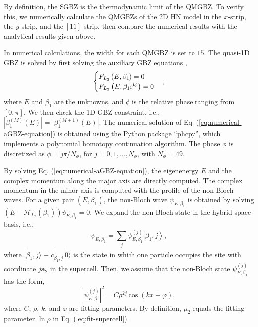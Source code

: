 By definition, the SGBZ is the thermodynamic limit of the QMGBZ. To
verify this, we numerically calculate the QMGBZs of the 2D HN model
in the $x$-strip, the $y$-strip, and the $[11]$-strip, then compare
the numerical results with the analytical results given above.

In numerical calculations, the width for each QMGBZ is set to $15$.
The quasi-1D GBZ is solved by first solving the auxiliary GBZ equations
\cite{yangNonHermitianBulkBoundaryCorrespondence2020}, 
\begin{equation}
\begin{cases}
F_{L_{2}}\left(E,\beta_{1}\right)=0\\
F_{L_{2}}\left(E,\beta_{1}\mathrm{e}^{\mathrm{i}\phi}\right)=0
\end{cases},\label{eq:numerical-aGBZ-equation}
\end{equation}
where $E$ and $\beta_{1}$ are the unknowns, and $\phi$ is the relative
phase ranging from $[0,\pi]$. We then check the 1D GBZ constraint,
i.e., $|\beta_{1}^{(M)}(E)|=|\beta_{1}^{(M+1)}(E)|$. The numerical
solution of Eq. (\ref{eq:numerical-aGBZ-equation}) is obtained using
the Python package ``phcpy''\cite{verscheldeAlgorithm795PHCpack1999},
which implements a polynomial homotopy continuation algorithm. The
phase $\phi$ is discretized as $\phi=j\pi/N_{\phi}$, for $j=0,1,\dots,N_{\phi}$,
with $N_{\phi}=49$.

By solving Eq. (\ref{eq:numerical-aGBZ-equation}), the eigenenergy
$E$ and the complex momentum along the major axis are directly computed.
The complex momentum in the minor axis is computed with the profile
of the non-Bloch waves. For a given pair $(E,\beta_{1})$, the non-Bloch
wave $\psi_{E,\beta_{1}}$ is obtained by solving $\left(E-\mathcal{H}_{L_{2}}(\beta_{1})\right)\psi_{E,\beta_{1}}=0$.
We expand the non-Bloch state in the hybrid space basis, i.e., 
\begin{equation}
\psi_{E,\beta_{1}}=\sum_{j}\psi_{E,\beta_{1}}^{(j)}\left|\beta_{1},j\right>,\label{eq:expand-non-Bloch-on-a2}
\end{equation}
where $|\beta_{1},j\rangle\equiv c_{\beta_{1},j}^{\dagger}|0\rangle$
is the state in which one particle occupies the site with coordinate
$j\mathbf{a}_{2}$ in the supercell. Then, we assume that the non-Bloch
state $\psi_{E,\beta_{1}}^{(j)}$ has the form, 
\begin{equation}
\left|\psi_{E,\beta_{1}}^{(j)}\right|^{2}=C\rho^{2j}\cos\left(kx+\varphi\right),\label{eq:fit-supercell}
\end{equation}
where $C$, $\rho$, $k$, and $\varphi$ are fitting parameters.
By definition, $\mu_{2}$ equals the fitting parameter $\ln\rho$
in Eq. (\ref{eq:fit-supercell}).

